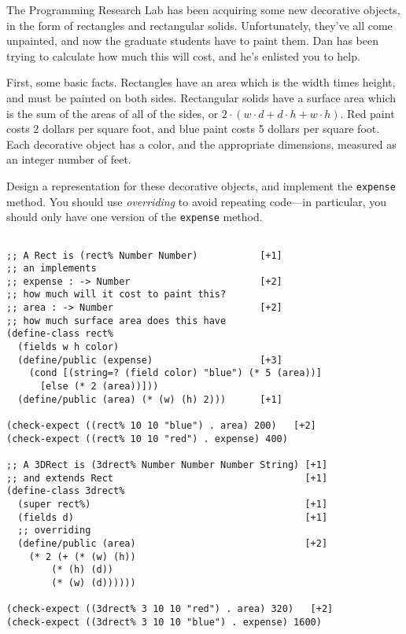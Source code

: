 \documentclass[12pt]{article}                   %
\def\pts#1{\marginpar{\footnotesize \raggedright  \fbox{#1 {\sc Points}}}}
\newenvironment{solution}{}{}
\begin{document}

\newpage

\begin{problem}\pts{19}

The Programming Research Lab has been acquiring some new decorative
objects, in the form of rectangles and rectangular solids.
Unfortunately, they've all come unpainted, and now the graduate
students have to paint them.  Dan has been trying to calculate how
much this will cost, and he's enlisted you to help.  

First, some basic facts.  Rectangles have an area which is the width
times height, and must be painted on both sides.  Rectangular solids
have a surface area which is the sum of the areas of all of the
sides, or $2 \cdot (w \cdot d + d \cdot h + w \cdot h)$. Red paint costs 2
dollars per square foot, and blue paint costs 5 dollars per square
foot.  
%
Each decorative object has a color, and the appropriate dimensions,
measured as an integer number of feet.  

Design a representation for these decorative objects, and implement
the {\tt expense} method.  You should use \emph{overriding} to avoid
repeating code---in particular, you should only have one version of
the {\tt expense} method.

\newpage
\ifrubric{}
\newpage
\fi

\begin{solution}
\begin{verbatim}

;; A Rect is (rect% Number Number)           [+1]
;; an implements
;; expense : -> Number                       [+2]
;; how much will it cost to paint this?
;; area : -> Number                          [+2]
;; how much surface area does this have
(define-class rect%
  (fields w h color)
  (define/public (expense)                   [+3]
    (cond [(string=? (field color) "blue") (* 5 (area))]
	  [else (* 2 (area))]))
  (define/public (area) (* (w) (h) 2)))      [+1]

(check-expect ((rect% 10 10 "blue") . area) 200)   [+2]
(check-expect ((rect% 10 10 "red") . expense) 400)

;; A 3DRect is (3drect% Number Number Number String) [+1]
;; and extends Rect                                  [+1]
(define-class 3drect%
  (super rect%)                                      [+1]
  (fields d)                                         [+1]
  ;; overriding
  (define/public (area)                              [+2]
    (* 2 (+ (* (w) (h))
	    (* (h) (d))
	    (* (w) (d))))))

(check-expect ((3drect% 3 10 10 "red") . area) 320)   [+2]
(check-expect ((3drect% 3 10 10 "blue") . expense) 1600)


\end{verbatim}
\end{solution}
\end{problem}
\newpage
\end{document}
